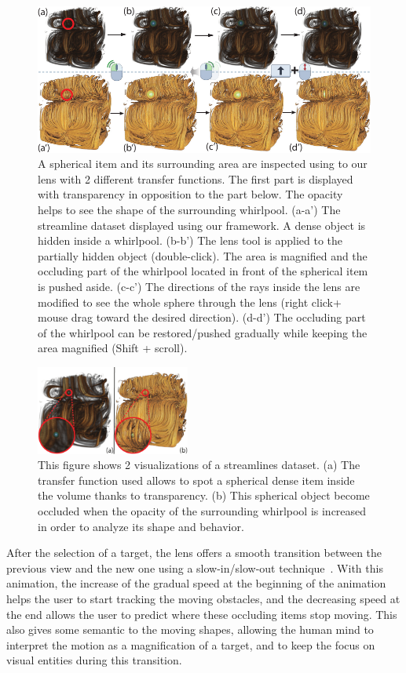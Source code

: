 \begin{figure} 
\includegraphics [width=\textwidth]{images/stream_lens.pdf} 
\caption{ A spherical item and its surrounding area are inspected using to our lens with 2 different transfer functions. The first part is displayed with transparency in opposition to the part below. The opacity helps to see the shape of the surrounding whirlpool. (a-a') The streamline dataset displayed using our framework. A dense object is hidden inside a whirlpool. (b-b') The lens tool is applied to the partially hidden object (double-click). The area is magnified and the occluding part of the whirlpool located in front of the spherical item is pushed aside. (c-c') The directions of the rays inside the lens are modified to see the whole sphere through the lens (right click+ mouse drag toward the desired direction). (d-d') The occluding part of the whirlpool can be restored/pushed gradually while keeping the area magnified (Shift + scroll).  }
\label{f:stream_lens}
\end{figure}

\begin{figure} 
\includegraphics [width=0.45\textwidth]{images/streamline_orientation.pdf} 
\caption{ This figure shows 2 visualizations of a streamlines dataset. (a) The transfer function used allows to spot a spherical dense item inside the volume thanks to transparency. (b) This spherical object become occluded when the opacity of the surrounding whirlpool is increased in order to analyze its shape and behavior. }
\label{f:streamLineSTDViz}
\end{figure}
After the selection of a target, the lens offers a smooth transition between the previous view and the new one using a  slow-in/slow-out technique~\cite{Dragicevic:2011:TDA:1978942.1979233}. With this animation, the increase of the gradual speed at the beginning of the animation helps the user to start tracking the moving obstacles, and the decreasing speed at the end allows the user to predict where these occluding items stop moving. This also gives some semantic to the moving shapes, allowing the human mind to interpret the motion as a magnification of a target, and to keep the focus on visual entities during this transition. 

